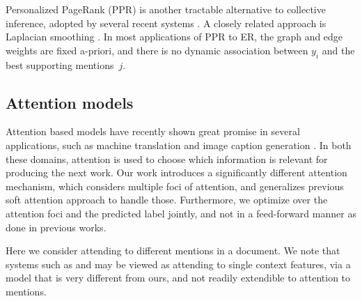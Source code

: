 Personalized PageRank (PPR) \cite{jeh2003scaling} is another tractable alternative to collective inference, adopted by several recent systems \cite{Han2011,He13,Alhelbawy14,Pershina2015}. A closely related approach is Laplacian smoothing \cite{Huang2014}.  In most applications of PPR to ER, the graph and edge weights are fixed a-priori, and there is no dynamic association between $y_i$ and the best supporting mentions~$j$.


\subsection{Attention models}
Attention based models have recently shown great promise in several applications, such as machine translation \cite{bahdanau2014neural} and image caption generation \cite{xu2015show}.  In both these domains, attention is used to choose which information is relevant for producing the next work. Our work introduces a significantly different attention mechanism, which considers multiple foci of attention, and generalizes previous soft attention approach to handle those. Furthermore, we optimize
over the attention foci and the predicted label jointly, and not in a feed-forward manner as done in previous works.

Here we consider attending to different mentions in a document. We note that systems such as  and  may be viewed as
attending to single context features, via a model that is very different from ours, and not readily extendible to attention to mentions.



